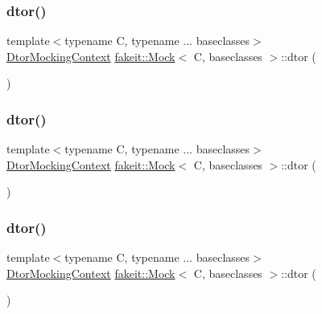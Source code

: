 \subsubsection{\texorpdfstring{dtor()}{dtor()}\hspace{0.1cm}{\footnotesize\ttfamily [5/9]}}
{\footnotesize\ttfamily template$<$typename C, typename ... baseclasses$>$ \\
\mbox{\hyperlink{classfakeit_1_1DtorMockingContext}{Dtor\+Mocking\+Context}} \mbox{\hyperlink{classfakeit_1_1Mock}{fakeit\+::\+Mock}}$<$ C, baseclasses $>$\+::dtor (\begin{DoxyParamCaption}{ }\end{DoxyParamCaption})\hspace{0.3cm}{\ttfamily [inline]}}

\mbox{\label{classfakeit_1_1Mock_a5c25c5db6e0e1b955137a1330f7348b9}} 
\subsubsection{\texorpdfstring{dtor()}{dtor()}\hspace{0.1cm}{\footnotesize\ttfamily [6/9]}}
{\footnotesize\ttfamily template$<$typename C, typename ... baseclasses$>$ \\
\mbox{\hyperlink{classfakeit_1_1DtorMockingContext}{Dtor\+Mocking\+Context}} \mbox{\hyperlink{classfakeit_1_1Mock}{fakeit\+::\+Mock}}$<$ C, baseclasses $>$\+::dtor (\begin{DoxyParamCaption}{ }\end{DoxyParamCaption})\hspace{0.3cm}{\ttfamily [inline]}}

\mbox{\label{classfakeit_1_1Mock_a5c25c5db6e0e1b955137a1330f7348b9}} 
\subsubsection{\texorpdfstring{dtor()}{dtor()}\hspace{0.1cm}{\footnotesize\ttfamily [7/9]}}
{\footnotesize\ttfamily template$<$typename C, typename ... baseclasses$>$ \\
\mbox{\hyperlink{classfakeit_1_1DtorMockingContext}{Dtor\+Mocking\+Context}} \mbox{\hyperlink{classfakeit_1_1Mock}{fakeit\+::\+Mock}}$<$ C, baseclasses $>$\+::dtor (\begin{DoxyParamCaption}{ }\end{DoxyParamCaption})\hspace{0.3cm}{\ttfamily [inline]}}

